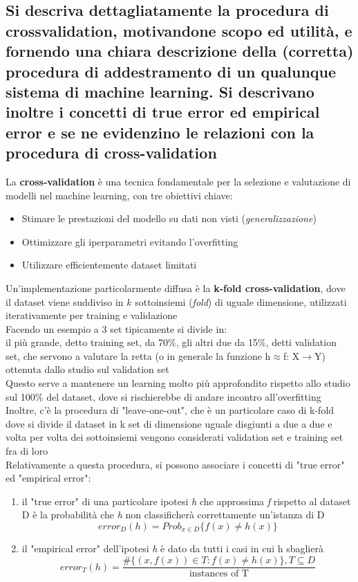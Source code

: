 \documentclass[10pt,oneside,a4paper]{article}
\begin{document}
	\subsection{Si descriva dettagliatamente la procedura di crossvalidation, motivandone scopo ed utilità,
		e fornendo una chiara descrizione della (corretta) procedura di addestramento di un
		qualunque sistema di machine learning. Si descrivano inoltre i concetti di true error ed
		empirical error e se ne evidenzino le relazioni con la procedura di cross-validation}
	La \textbf{cross-validation} è una tecnica fondamentale per la selezione e valutazione di modelli nel machine learning, con tre obiettivi chiave:
	\begin{itemize}
		\item Stimare le prestazioni del modello su dati non visti (\textit{generalizzazione})
		\item Ottimizzare gli iperparametri evitando l'overfitting
		\item Utilizzare efficientemente dataset limitati
	\end{itemize}
	Un'implementazione particolarmente diffusa è la \textbf{k-fold cross-validation}, dove il dataset viene suddiviso in $k$ sottoinsiemi (\textit{fold}) di uguale dimensione, utilizzati iterativamente per training e validazione\\
	Facendo un esempio a 3 set tipicamente si divide in:\\
	il più grande, detto training set, da 70\%, gli altri due da 15\%, detti validation set, che servono a valutare la retta (o in generale la funzione h$\approx$f: X$\to$Y) ottenuta dallo studio sul validation set\\
	Questo serve a mantenere un learning molto più approfondito rispetto allo studio sul 100\% del dataset, dove si rischierebbe di andare incontro all'overfitting\\
	Inoltre, c'è la procedura di "leave-one-out", che è un particolare caso di k-fold dove si divide il dataset in k set di dimensione uguale disgiunti a due a due e volta per volta dei sottoinsiemi vengono considerati validation set e training set fra di loro\\
	Relativamente a questa procedura, si possono associare i concetti di "true error" ed "empirical error":\\
	\begin{enumerate}
		\item il "true error" di una particolare ipotesi \textit{h} che approssima \textit{f} rispetto al dataset D è la probabilità che
			  \textit{h} non classificherà correttamente un'istanza di D\\
			  \[ error_D(h) = Prob_{x \in D}\{ f(x) \neq h(x) \} \]
		\item il "empirical error" dell'ipotesi \textit{h} è dato da tutti i casi in cui h sbaglierà\\
			  \[ error_T(h) = \frac{\#\{ (x,f(x)) \in T : f(x) \neq h(x) \}, T \subseteq D}{\text{instances of T}} \]
	\end{enumerate}
\end{document}
